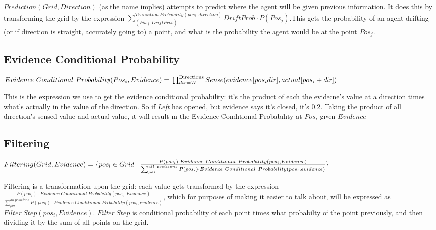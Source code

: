 \documentclass[11pt]{article}
\begin{document}
\(Prediction(Grid, Direction)\) (as the name implies) attempts to predict where the agent will be given previous information. It does this by transforming the grid by the expression  \(\sum^{Transition\ Probability(pos_i, direction)}_{(Pos_j, DriftProb)} DriftProb \cdot P(Pos_j)\).This gets the probability of an agent drifting (or if direction is straight, accurately going to) a point, and what is the probability the agent would be at the point \(Pos_j\).


\subsection*{Evidence Conditional Probability}
\label{sec:orga842a8d}
   \begin{math}
  Evidence\ Conditional\ Probability(Pos_i, Evidence)= \\
  \prod^{\text{Directions} }_{dir=W} Sense(evidence[pos_i dir], actual[pos_i+dir])
\end{math}

This is the expression we use to get the evidence conditional probability: it's the product of each the evidecne's value at a direction times what's actually in the value of the direction. So if \emph{Left} has opened, but evidence says it's closed, it's 0.2. Taking the product of all direction's sensed value and actual value, it will result in the Evidence Conditional Probability at \(Pos_i\) given \(Evidence\)

\subsection*{Filtering}
\label{sec:orgce0b42a}


   \begin{math}
Filtering(Grid, Evidence) = \{pos_i \in Grid \mid\\
\frac{P(pos_i) \cdot Evidence\ Conditional\ Probability(pos_i, Evidence) }{\sum^{all\ positions}_{pos} P(pos_i) \cdot Evidence\ Conditional\ Probability(pos_i, evidence) } \}
\end{math}



Filtering is a transformation upon the grid: each value gets transformed by the expression \(\frac{P(pos_i) \cdot Evidence\ Conditional\ Probability(pos_i, Evidence) }{\sum^{all\ positions}_{pos} P(pos_i) \cdot Evidence\ Conditional\ Probability(pos_i, evidence) }\), which for purposes of making it easier to talk about, will be expressed as \(Filter\ Step(pos_i, Evidence)\). \(Filter\ Step\) is conditional probability of each point times what probabilty of the  point previously, and then dividing it  by the sum of all points on the grid. 
\end{document}
